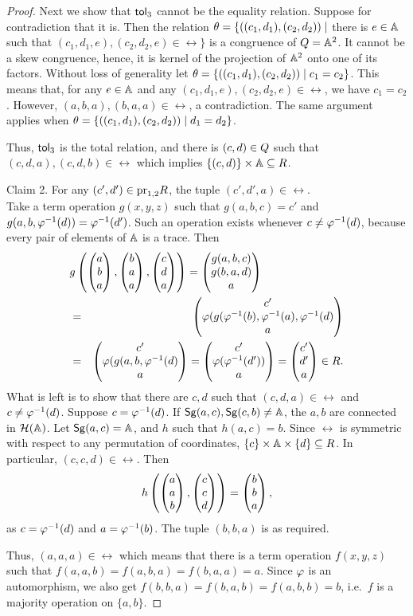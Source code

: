 \documentclass[11pt]{article}
\begin{document}
\begin{proof}
Next we show that ${\sf tol}_3$ cannot be the equality relation. Suppose
for contradiction that it is. Then the relation
$\theta=\{((c_1,d_1),(c_2,d_2))\mid $ there is $e\in{\mathbb A}$ such that
$(c_1,d_1,e),(c_2,d_2,e)\in\rel\}$ is a congruence of $Q={\mathbb A}^2$. It
cannot be a skew congruence, hence, it is kernel of the projection of
${\mathbb A}^2$ onto one of its factors. Without loss of generality let
$\theta=\{((c_1,d_1),(c_2,d_2))\mid c_1=c_2\}$. This means that, for any
$e\in{\mathbb A}$ and any $(c_1,d_1,e),(c_2,d_2,e)\in\rel$, we have
$c_1=c_2$. However, $(a,b,a),(b,a,a)\in\rel$, a contradiction. The same
argument applies when $\theta=\{((c_1,d_1),(c_2,d_2))\mid d_1=d_2\}$.

Thus, ${\sf tol}_3$ is the total relation, and there is $(c,d)\in Q$ such
that $(c,d,a),(c,d,b)\in\rel$ which implies $\{(c,d)\}\times{\mathbb A}\subseteq R$. 
\medskip

\noindent
{\sc Claim 2.} For any $(c',d')\in{\rm pr}_{1,2}R$, the tuple
$(c',d',a)\in\rel$.\\[2mm]
Take a term operation $g(x,y,z)$ such that $g(a,b,c)=c'$ and
$g(a,b,\varphi^{-1}(d))=\varphi^{-1}(d')$. Such an operation exists whenever 
$c\ne\varphi^{-1}(d)$, because every pair of elements of ${\mathbb A}$ is a trace.
Then
\begin{eqnarray*}
\lefteqn{g\left(\cll aba,\cll baa,\cll cda\right)=\cll{g(a,b,c)}{g(b,a,d)}a}\\
&=&\cll{c'}{\vf(g(\vf^{-1}(b),\vf^{-1}(a),\vf^{-1}(d)}a\\
&=&\cll{c'}{\vf(g(a,b,\vf^{-1}(d)}a=
\cll{c'}{\vf(\vf^{-1}(d'))}a=\cll{c'}{d'}a\in\rel. 
\end{eqnarray*}
What is left is to show that there are $c,d$ such that $(c,d,a)\in\rel$ and  $c\ne\varphi^{-1}(d)$. 
Suppose $c=\varphi^{-1}(d)$. If ${\sf Sg}(a,c),{\sf Sg}(c,b)\ne{\mathbb A}$, the $a,b$ are connected in
${\mathcal H}({\mathbb A})$.  Let ${\sf Sg}(a,c)={\mathbb A}$, and $h$ such that $h(a,c)=b$. Since $\rel$ is 
symmetric with respect to any permutation of coordinates, 
$\{c\}\times{\mathbb A}\times\{d\}\subseteq R$. In particular, $(c,c,d)\in\rel$. Then
$$
h\left(\cll aab,\cll ccd\right)=\cll bba,
$$
as $c=\varphi^{-1}(d)$ and $a=\varphi^{-1}(b)$. The tuple $(b,b,a)$ is as required.

Thus, $(a,a,a)\in\rel$ which means that there is a term operation
$f(x,y,z)$ such that $f(a,a,b)=f(a,b,a)=f(b,a,a)=a$. Since $\varphi$ is an 
automorphism, we also get $f(b,b,a)=f(b,a,b)=f(a,b,b)=b$, i.e.\ $f$ is 
a majority operation on $\{a,b\}$.
\end{proof}
\end{document}
